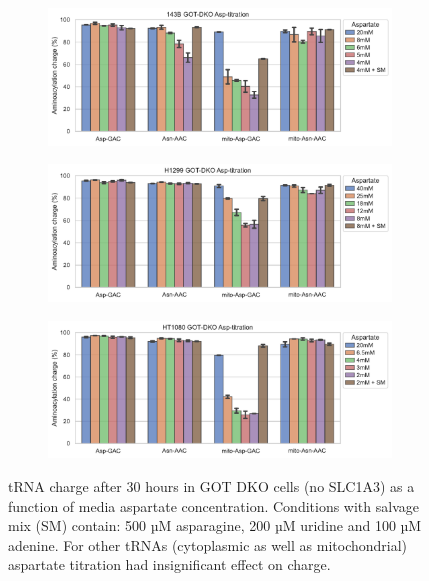 \begin{figure}[!ht]
     \centering
     \begin{subfigure}[b]{0.7\textwidth}
         \includegraphics[width=\textwidth]{figures/sapp/tRNA/143B-DKO_Asp-Asn.pdf}
     \end{subfigure}
     \begin{subfigure}[b]{0.7\textwidth}
         \vspace{5pt}
         \includegraphics[width=\textwidth]{figures/sapp/tRNA/H1299-DKO_charge_Asp-Asn.pdf}
     \end{subfigure}
     \begin{subfigure}[b]{0.7\textwidth}
         \vspace{5pt}
         \includegraphics[width=\textwidth]{figures/sapp/tRNA/HT1080-DKO_charge_Asp-Asn.pdf}
     \end{subfigure}
     \hfill
        \caption[tRNA charge in GOT DKO Asp-tit.]{
        tRNA charge after 30 hours in GOT DKO cells (no SLC1A3) as a function of media aspartate concentration.
        Conditions with salvage mix (SM) contain: 500 µM asparagine, 200 µM uridine and 100 µM adenine.
        For other tRNAs (cytoplasmic as well as mitochondrial) aspartate titration had insignificant effect on charge.
        }
        \label{fig:sapp:tRNA:DKO_Asp-Asn}
\end{figure}



